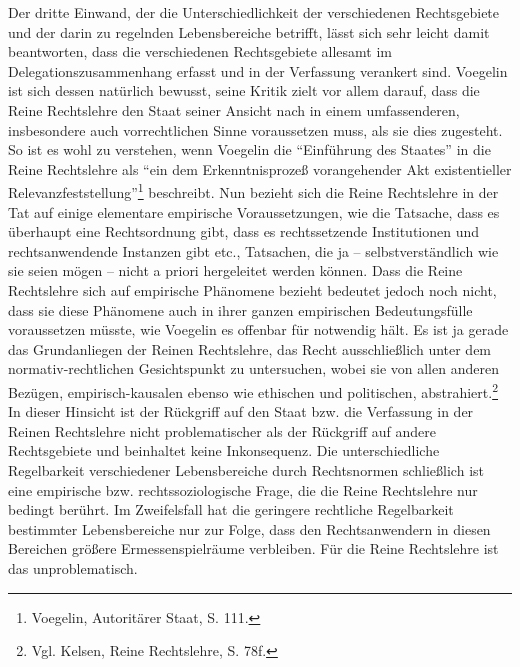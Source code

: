 \documentclass[12pt,a4paper,ngerman]{article}
\begin{document}
Der dritte Einwand, der die Unterschiedlichkeit der verschiedenen
Rechtsgebiete und der darin zu regelnden Lebensbereiche betrifft, lässt sich
sehr leicht damit beantworten, dass die verschiedenen Rechtsgebiete allesamt
im Delegationszusammenhang erfasst und in der Verfassung verankert sind.
Voegelin ist sich dessen natürlich bewusst, seine Kritik zielt vor allem
darauf, dass die Reine Rechtslehre den Staat seiner Ansicht nach in einem
umfassenderen, insbesondere auch vorrechtlichen Sinne voraussetzen muss, als
sie dies zugesteht. So ist es wohl zu verstehen, wenn Voegelin die
"`Einführung des Staates"' in die Reine Rechtslehre als "`ein dem
Erkenntnisprozeß vorangehender Akt existentieller
Relevanzfeststellung"'\footnote{Voegelin, Autoritärer Staat, S. 111.}
beschreibt.
Nun bezieht sich die Reine Rechtslehre in der Tat auf einige elementare
empirische Voraussetzungen, wie die Tatsache, dass es überhaupt eine
Rechtsordnung gibt, dass es rechtssetzende Institutionen und rechtsanwendende
Instanzen gibt etc., Tatsachen, die ja -- selbstverständlich wie sie seien
mögen -- nicht a priori hergeleitet werden können. Dass die Reine Rechtslehre
sich auf empirische Phänomene bezieht bedeutet jedoch noch nicht, dass sie
diese Phänomene auch in ihrer ganzen empirischen Bedeutungsfülle voraussetzen
müsste, wie Voegelin es offenbar für notwendig hält. Es ist ja gerade das
Grundanliegen der Reinen Rechtslehre, das Recht ausschließlich unter dem
normativ-rechtlichen Gesichtspunkt zu untersuchen, wobei sie von allen anderen
Bezügen, empirisch-kausalen ebenso wie ethischen und politischen,
abstrahiert.\footnote{Vgl. Kelsen, Reine Rechtslehre, S. 78f.}  In dieser
Hinsicht ist der Rückgriff auf den Staat bzw. die Verfassung in der Reinen
Rechtslehre nicht problematischer als der Rückgriff auf andere Rechtsgebiete
und beinhaltet keine Inkonsequenz. Die unterschiedliche Regelbarkeit
verschiedener Lebensbereiche durch Rechtsnormen schließlich ist eine
empirische bzw. rechtssoziologische Frage, die die Reine Rechtslehre nur
bedingt berührt. Im Zweifelsfall hat die geringere rechtliche Regelbarkeit
bestimmter Lebensbereiche nur zur Folge, dass den Rechtsanwendern in diesen
Bereichen größere Ermessenspielräume verbleiben. Für die Reine Rechtslehre ist
das unproblematisch.
\end{document}
